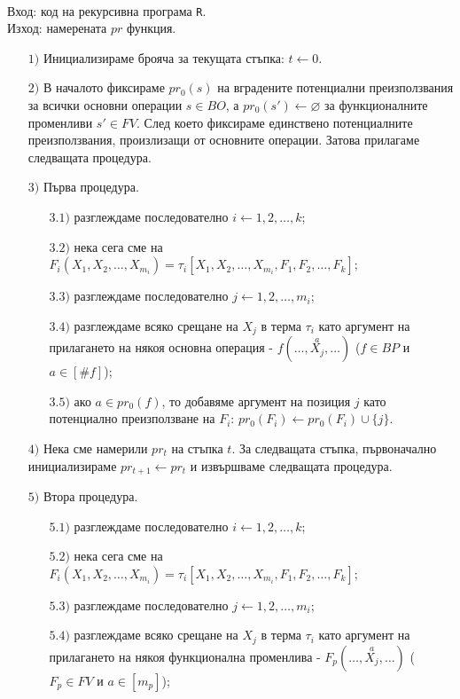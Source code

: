 \documentclass[12pt,twoside,a4paper]{article}
\begin{document}
	\begin{algorithm}\label{algo:pr}~
		
		Вход: код на рекурсивна програма \texttt{R}.\\
		\indent Изход: намерената $pr$ функция.
		
		\begin{itemize}
			\item[$1)$] Инициализираме брояча за текущата стъпка: $t \gets 0$.
			\item[$2)$] В началото фиксираме $pr_0(s)$ на вградените потенциални преизползвания за всички основни операции $s \in BO$, а $pr_0(s') \gets \varnothing$ за функционалните променливи $s' \in FV$. След което фиксираме единствено потенциалните преизползвания, произлизащи от основните операции. Затова прилагаме следващата процедура.
			\item[$3)$] Първа процедура.
			\begin{itemize}
				\item[$3.1)$] разглеждаме последователно $i \gets 1,2,\dots,k$;
				\item[$3.2)$] нека сега сме на $F_i(X_1,X_2,\dots,X_{m_i})=\tau_i[X_1, X_2, \dots, X_{m_i}, F_1, F_2, \dots, F_k]$;
				\item[$3.3)$] разглеждаме последователно $j \gets 1,2,\dots,m_i$;
				\item[$3.4)$] разглеждаме всяко срещане на $X_j$ в терма $\tau_i$ като аргумент на прилагането на някоя основна операция - $f(\dots,\overset{a}{X_j},\dots)$ ($f \in BP$ и $a \in [\#f]$);
				\item[$3.5)$] ако $a \in pr_0(f)$, то добавяме аргумент на позиция $j$ като потенциално преизползване на $F_i$: $pr_0(F_i) \gets pr_0(F_i) \cup \{j\}$.
			\end{itemize}
			\item[$4)$] Нека сме намерили $pr_t$ на стъпка $t$. За следващата стъпка, първоначално инициализираме $pr_{t+1} \gets pr_t$ и извършваме следващата процедура.
			\item[$5)$] Втора процедура.
			\begin{itemize}
				\item[$5.1)$] разглеждаме последователно $i \gets 1,2,\dots,k$;
				\item[$5.2)$] нека сега сме на $F_i(X_1,X_2,\dots,X_{m_i})=\tau_i[X_1, X_2, \dots, X_{m_i}, F_1, F_2, \dots, F_k]$;
				\item[$5.3)$] разглеждаме последователно $j \gets 1,2,\dots,m_i$;
				\item[$5.4)$] разглеждаме всяко срещане на $X_j$ в терма $\tau_i$ като аргумент на прилагането на някоя функционална променлива - $F_p(\dots,\overset{a}{X_j},\dots)$ ($F_p \in FV$ и $a \in [m_p]$);

\end{itemize}
\end{itemize}
\end{algorithm}
\end{document}
